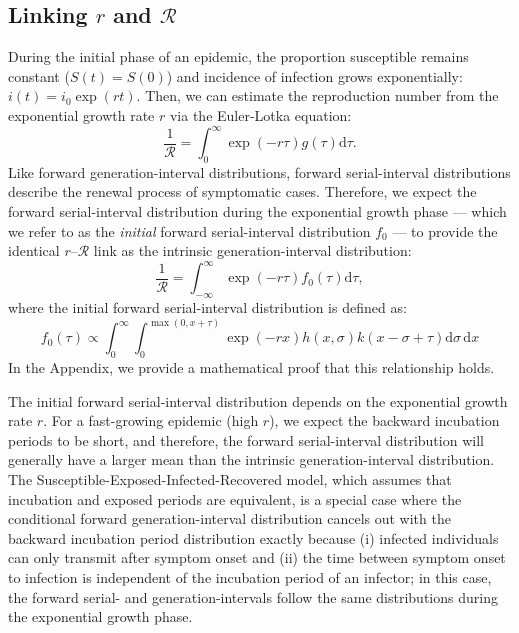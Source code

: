 \documentclass[12pt]{article}
\begin{document}
\subsection{Linking $r$ and $\mathcal R$}

During the initial phase of an epidemic, the proportion susceptible remains constant ($S(t) = S(0)$) and incidence of infection grows exponentially: $i(t)=i_0\exp(rt)$.
Then, we can estimate the reproduction number from the exponential growth rate $r$ via the Euler-Lotka equation:
\begin{equation}
\frac{1}{\mathcal R} = \int_0^\infty \exp(-r\tau) g(\tau) \mathrm{d} \tau.
\end{equation}
Like forward generation-interval distributions, 
forward serial-interval distributions describe the renewal process of symptomatic cases.
Therefore, we expect the forward serial-interval distribution during the exponential growth phase --- which we refer to as the \emph{initial} forward serial-interval distribution $f_0$ --- to provide the identical $r$--$\mathcal R$ link as the intrinsic generation-interval distribution:
\begin{equation}
\frac{1}{\mathcal R} = \int_{-\infty}^\infty \exp(-r\tau) f_{0}(\tau) \mathrm{d} \tau,
\end{equation}
where the initial forward serial-interval distribution is defined as:
\begin{equation}
f_{0}(\tau) \propto \int_{0}^{\infty} \int_{0}^{\max(0,x+\tau)} \exp(-rx) h(x, \sigma) k(x-\sigma+\tau) \mathrm{d}\sigma\,\mathrm{d}x
\end{equation}
In the Appendix, we provide a mathematical proof that this relationship holds.

The initial forward serial-interval distribution depends on the exponential growth rate $r$.
For a fast-growing epidemic (high $r$), we expect the backward incubation periods to be short, and therefore, the forward serial-interval distribution will generally have a larger mean than the intrinsic generation-interval distribution.
The Susceptible-Exposed-Infected-Recovered model, which assumes that incubation and exposed periods are equivalent, is a special case where the conditional forward generation-interval distribution cancels out with the backward incubation period distribution exactly because (i) infected individuals can only transmit after symptom onset and (ii) the time between symptom onset to infection is independent of the incubation period of an infector;
in this case, the forward serial- and generation-intervals follow the same distributions during the exponential growth phase.
\end{document}
